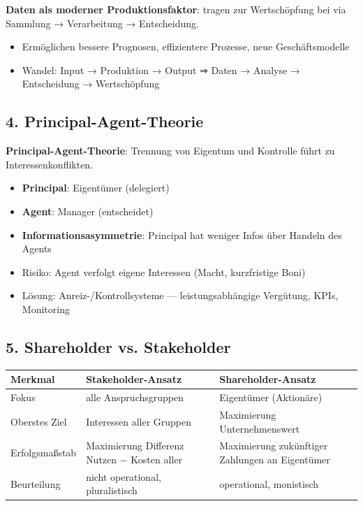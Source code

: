 \documentclass[11pt, a4paper]{article}
\begin{document}
\textbf{Daten als moderner Produktionsfaktor}: tragen zur Wertschöpfung bei via Sammlung → Verarbeitung → Entscheidung.

\begin{itemize}
  \item Ermöglichen bessere Prognosen, effizientere Prozesse, neue Geschäftsmodelle
  \item Wandel: Input → Produktion → Output  ⇒  Daten → Analyse → Entscheidung → Wertschöpfung
\end{itemize}


\subsection{4. Principal-Agent-Theorie}

\textbf{Principal-Agent-Theorie}: Trennung von Eigentum und Kontrolle führt zu Interessenkonflikten.

\begin{itemize}
  \item \textbf{Principal}: Eigentümer (delegiert)
  \item \textbf{Agent}: Manager (entscheidet)
  \item \textbf{Informationsasymmetrie}: Principal hat weniger Infos über Handeln des Agents
  \item Risiko: Agent verfolgt eigene Interessen (Macht, kurzfristige Boni)
  \item Lösung: Anreiz-/Kontrollsysteme — leistungsabhängige Vergütung, KPIs, Monitoring
\end{itemize}


\subsection{5. Shareholder vs. Stakeholder}


{\small
\begin{tabularx}{\linewidth}{XXX}
\hline
\rowcolor{tableheadbg}
{\color{white}\textbf{Merkmal}} & {\color{white}\textbf{Stakeholder-Ansatz}} & {\color{white}\textbf{Shareholder-Ansatz}} \\[2pt]
\hline
\endhead
\hline
\endfoot
Fokus & alle Anspruchsgruppen & Eigentümer (Aktionäre) \\
Oberstes Ziel & Interessen aller Gruppen & Maximierung Unternehmenswert \\
Erfolgsmaßstab & Maximierung Differenz Nutzen − Kosten aller & Maximierung zukünftiger Zahlungen an Eigentümer \\
Beurteilung & nicht operational, pluralistisch & operational, monistisch \\
\end{tabularx}
}
\end{document}
